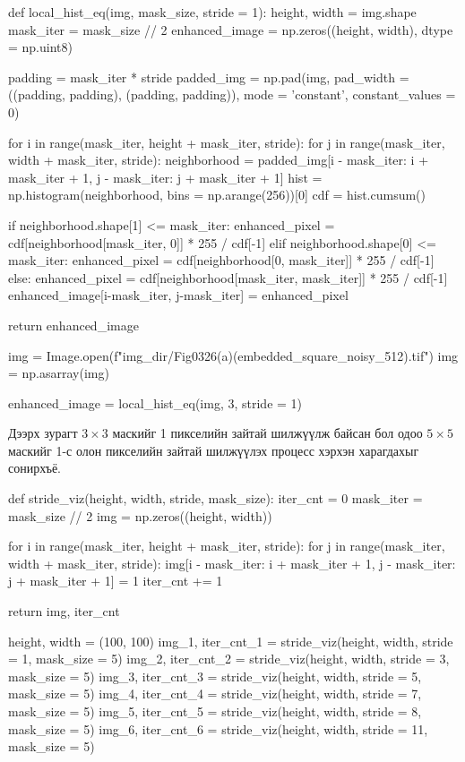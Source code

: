 \documentclass[a4paper]{article}
\begin{document}
\begin{python}
def local_hist_eq(img, mask_size, stride = 1):
    height, width = img.shape
    mask_iter = mask_size // 2
    enhanced_image = np.zeros((height, width), dtype = np.uint8)

    padding = mask_iter * stride
    padded_img = np.pad(img, pad_width = ((padding, padding), (padding, padding)), 
                        mode = 'constant', constant_values = 0)

    for i in range(mask_iter, height + mask_iter, stride):
        for j in range(mask_iter, width + mask_iter, stride):
            neighborhood = padded_img[i - mask_iter: i + mask_iter + 1, j - mask_iter: j + mask_iter + 1]
            hist = np.histogram(neighborhood, bins = np.arange(256))[0]
            cdf = hist.cumsum()

            if neighborhood.shape[1] <= mask_iter:
                enhanced_pixel = cdf[neighborhood[mask_iter, 0]] * 255 / cdf[-1]
            elif neighborhood.shape[0] <= mask_iter:
                enhanced_pixel = cdf[neighborhood[0, mask_iter]] * 255 / cdf[-1]
            else:
                enhanced_pixel = cdf[neighborhood[mask_iter, mask_iter]] * 255 / cdf[-1]
            enhanced_image[i-mask_iter, j-mask_iter] = enhanced_pixel
            
    return enhanced_image
\end{python} 
\begin{python}
img = Image.open(f"{img_dir}/Fig0326(a)(embedded_square_noisy_512).tif")
img = np.asarray(img)

enhanced_image = local_hist_eq(img, 3, stride = 1)
\end{python} \hfill \break\hfill \break
Дээрх зурагт $3\times3$ маскийг 1 пикселийн зайтай шилжүүлж байсан бол одоо $5\times5$ маскийг 1-с олон пикселийн зайтай шилжүүлэх процесс хэрхэн харагдахыг сонирхъё.
\begin{python}
def stride_viz(height, width, stride, mask_size):
    iter_cnt = 0
    mask_iter = mask_size // 2
    img = np.zeros((height, width))

    for i in range(mask_iter, height + mask_iter, stride):
        for j in range(mask_iter, width + mask_iter, stride):
            img[i - mask_iter: i + mask_iter + 1, j - mask_iter: j + mask_iter + 1] = 1
            iter_cnt += 1
    
    return img, iter_cnt

height, width = (100, 100)
img_1, iter_cnt_1 = stride_viz(height, width, stride = 1, mask_size = 5)
img_2, iter_cnt_2 = stride_viz(height, width, stride = 3, mask_size = 5)
img_3, iter_cnt_3 = stride_viz(height, width, stride = 5, mask_size = 5)
img_4, iter_cnt_4 = stride_viz(height, width, stride = 7, mask_size = 5)
img_5, iter_cnt_5 = stride_viz(height, width, stride = 8, mask_size = 5)
img_6, iter_cnt_6 = stride_viz(height, width, stride = 11, mask_size = 5)
\end{python} 
\end{document}
